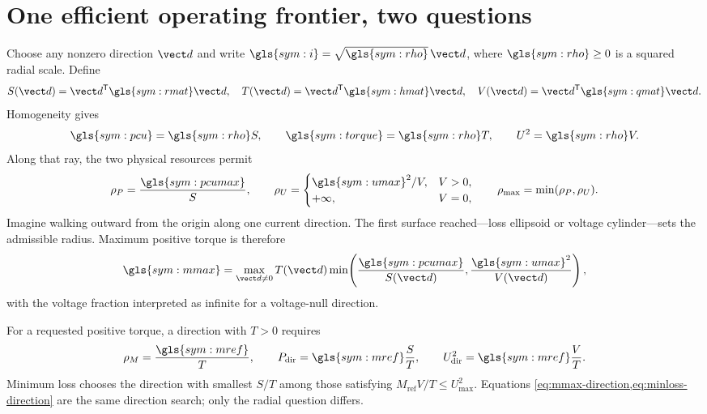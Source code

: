 \section{One efficient operating frontier, two questions}
\label{sec:frontier}

Choose any nonzero direction \(\vect d\) and write
\(\gls{sym:i}=\sqrt{\gls{sym:rho}}\,\vect d\), where
\(\gls{sym:rho}\geq0\) is a squared radial scale. Define
\begin{equation}
 S(\vect d)=\vect d^{\mathsf T}\gls{sym:rmat}\vect d,\quad
 T(\vect d)=\vect d^{\mathsf T}\gls{sym:hmat}\vect d,\quad
 V(\vect d)=\vect d^{\mathsf T}\gls{sym:qmat}\vect d.
\end{equation}
Homogeneity gives
\begin{equation}
 \gls{sym:pcu}=\gls{sym:rho}S,\qquad
 \gls{sym:torque}=\gls{sym:rho}T,\qquad
 U^2=\gls{sym:rho}V.
 \label{eq:radial-separation}
\end{equation}
Along that ray, the two physical resources permit
\begin{equation}
 \rho_P=\frac{\gls{sym:pcumax}}{S},\qquad
 \rho_U=\begin{cases}\gls{sym:umax}^2/V,&V>0,\\+\infty,&V=0,\end{cases}
 \qquad \rho_{\max}=\min(\rho_P,\rho_U).
 \label{eq:radial-limits}
\end{equation}
Imagine walking outward from the origin along one current direction. The first
surface reached---loss ellipsoid or voltage cylinder---sets the admissible
radius. Maximum positive torque is therefore
\begin{equation}
 \gls{sym:mmax}=\max_{\vect d\neq0}T(\vect d)
 \min\!\left(\frac{\gls{sym:pcumax}}{S(\vect d)},
 \frac{\gls{sym:umax}^2}{V(\vect d)}\right),
 \label{eq:mmax-direction}
\end{equation}
with the voltage fraction interpreted as infinite for a voltage-null
direction.

For a requested positive torque, a direction with \(T>0\) requires
\begin{equation}
 \rho_M=\frac{\gls{sym:mref}}{T},\qquad
 P_{\mathrm{dir}}=\gls{sym:mref}\frac{S}{T},\qquad
 U_{\mathrm{dir}}^2=\gls{sym:mref}\frac{V}{T}.
 \label{eq:minloss-direction}
\end{equation}
Minimum loss chooses the direction with smallest \(S/T\) among those satisfying
\(M_{\mathrm{ref}}V/T\leq U_{\max}^2\). Equations
\cref{eq:mmax-direction,eq:minloss-direction} are the same direction search;
only the radial question differs.


